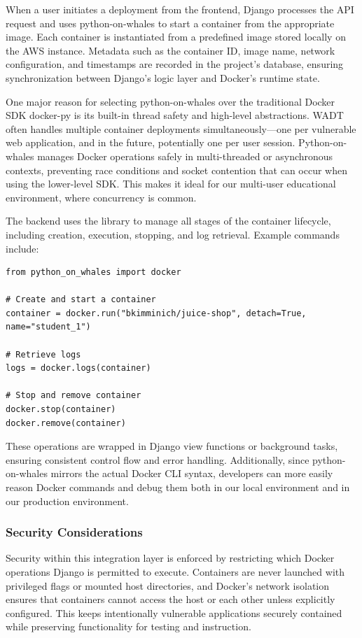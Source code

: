 \documentclass[12pt,titlepage]{article}
\begin{document}
When a user initiates a deployment from the frontend, Django processes the API request and uses python-on-whales to start a container from the appropriate image. Each container is instantiated from a predefined image stored locally on the AWS instance. Metadata such as the container ID, image name, network configuration, and timestamps are recorded in the project’s database, ensuring synchronization between Django’s logic layer and Docker’s runtime state.

One major reason for selecting python-on-whales over the traditional Docker SDK docker-py is its built-in thread safety and high-level abstractions. WADT often handles multiple container deployments simultaneously—one per vulnerable web application, and in the future, potentially one per user session. Python-on-whales manages Docker operations safely in multi-threaded or asynchronous contexts, preventing race conditions and socket contention that can occur when using the lower-level SDK. This makes it ideal for our multi-user educational environment, where concurrency is common.

The backend uses the library to manage all stages of the container lifecycle, including creation, execution, stopping, and log retrieval. Example commands include:
\begin{verbatim}
from python_on_whales import docker

# Create and start a container
container = docker.run("bkimminich/juice-shop", detach=True, name="student_1")

# Retrieve logs
logs = docker.logs(container)

# Stop and remove container
docker.stop(container)
docker.remove(container)
\end{verbatim}

These operations are wrapped in Django view functions or background tasks, ensuring consistent control flow and error handling. Additionally, since python-on-whales mirrors the actual Docker CLI syntax, developers can more easily reason Docker commands and debug them both in our local environment and in our production environment.

\subsubsection{Security Considerations}
Security within this integration layer is enforced by restricting which Docker operations Django is permitted to execute. Containers are never launched with privileged flags or mounted host directories, and Docker’s network isolation ensures that containers cannot access the host or each other unless explicitly configured. This keeps intentionally vulnerable applications securely contained while preserving functionality for testing and instruction.
\end{document}
